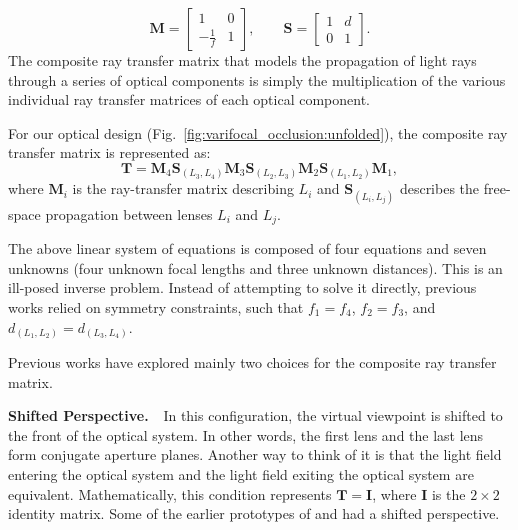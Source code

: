 %
\begin{equation}
\mathbf{M} = 
\begin{bmatrix}
1 & 0 \\
-\frac{1}{f} & 1 
\end{bmatrix},
\quad \quad
\mathbf{S} = 
\begin{bmatrix}
1 & d \\
0 & 1 
\end{bmatrix}.
\end{equation}
%
The composite ray transfer matrix that models the propagation of light rays through a series of optical components is simply the multiplication of the various individual ray transfer matrices of each optical component. 

For our optical design (Fig.~\ref{fig:varifocal_occlusion:unfolded}), the composite ray transfer matrix is represented as:
%
\begin{equation}
\mathbf{T} = \mathbf{M}_4 \mathbf{S}_{(L_3,L_4)} \mathbf{M}_3 \mathbf{S}_{(L_2,L_3)} \mathbf{M}_2 \mathbf{S}_{(L_1,L_2)} \mathbf{M}_1,
\label{eq:static_general}
\end{equation}
%
where $\mathbf{M}_i$ is the ray-transfer matrix describing $L_i$ and $\mathbf{S}_{(L_i,L_j)}$ describes the free-space propagation between lenses $L_i$ and $L_j$.

The above linear system of equations is composed of four equations and seven unknowns (four unknown focal lengths and three unknown distances). This is an ill-posed inverse problem. Instead of attempting to solve it directly, previous works relied on symmetry constraints, such that $f_1 = f_4$, $f_2 = f_3$, and $d_{(L_1,L_2)} = d_{(L_3,L_4)}$.

%
%

Previous works have explored mainly two choices for the composite ray transfer matrix.

{\bf Shifted Perspective. $\,\,$}
In this configuration, the virtual viewpoint is shifted to the front of the optical system. In other words, the first lens and the last lens form conjugate aperture planes. Another way to think of it is that the light field entering the optical system and the light field exiting the optical system are equivalent. Mathematically, this condition represents $\mathbf{T} = \mathbf{I}$, where $\mathbf{I}$ is the $2 \times 2$ identity matrix. Some of the earlier prototypes of \citet{Kiyokawa2000,Kiyokawa2001} and \citet{Cakmakci2004} had a shifted perspective. 

